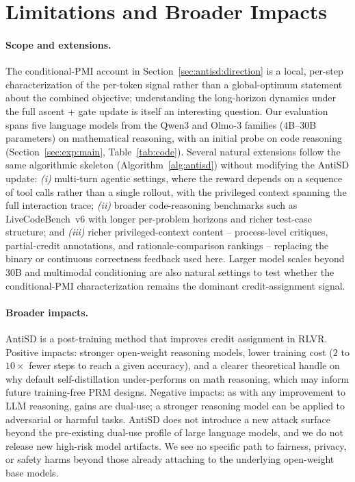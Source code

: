 \documentclass{article}
\begin{document}
\section{Limitations and Broader Impacts}
\label{app:impacts}

\paragraph{Scope and extensions.} The conditional-PMI account in Section~\ref{sec:antisd:direction} is a local, per-step characterization of the per-token signal rather than a global-optimum statement about the combined objective; understanding the long-horizon dynamics under the full ascent + gate update is itself an interesting question. Our evaluation spans five language models from the Qwen3 and Olmo-3 families ($4$B--$30$B parameters) on mathematical reasoning, with an initial probe on code reasoning (Section~\ref{sec:exp:main}, Table~\ref{tab:code}). Several natural extensions follow the same algorithmic skeleton (Algorithm~\ref{alg:antisd}) without modifying the AntiSD update: \emph{(i)} multi-turn agentic settings, where the reward depends on a sequence of tool calls rather than a single rollout, with the privileged context spanning the full interaction trace; \emph{(ii)} broader code-reasoning benchmarks such as LiveCodeBench~v6 with longer per-problem horizons and richer test-case structure; and \emph{(iii)} richer privileged-context content -- process-level critiques, partial-credit annotations, and rationale-comparison rankings -- replacing the binary or continuous correctness feedback used here. Larger model scales beyond $30$B and multimodal conditioning are also natural settings to test whether the conditional-PMI characterization remains the dominant credit-assignment signal.

\paragraph{Broader impacts.} AntiSD is a post-training method that improves credit assignment in RLVR. Positive impacts: stronger open-weight reasoning models, lower training cost ($2$ to $10\times$ fewer steps to reach a given accuracy), and a clearer theoretical handle on why default self-distillation under-performs on math reasoning, which may inform future training-free PRM designs. Negative impacts: as with any improvement to LLM reasoning, gains are dual-use; a stronger reasoning model can be applied to adversarial or harmful tasks. AntiSD does not introduce a new attack surface beyond the pre-existing dual-use profile of large language models, and we do not release new high-risk model artifacts. We see no specific path to fairness, privacy, or safety harms beyond those already attaching to the underlying open-weight base models.
\end{document}
